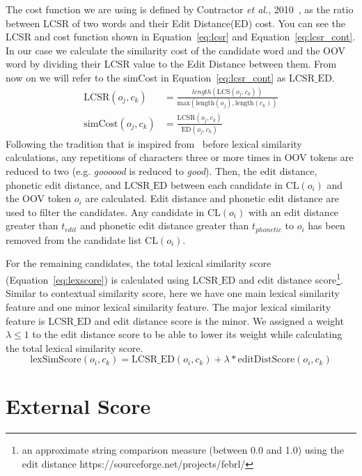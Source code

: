 \documentclass[a4paper,onesided,12pt]{report}
\begin{document}
The cost function we are using is defined by Contractor \textit{et al.}, 2010~\cite{Contractor:2010:UCN:1944566.1944588}, as the ratio between LCSR of two words and their Edit Distance(ED) cost. You can see the LCSR and cost function shown in Equation~\ref{eq:lcsr} and Equation~\ref{eq:lcsr_cont}. In our case we calculate the similarity cost of the candidate word and the OOV word by dividing their LCSR value to the Edit Distance between them. From now on we will refer to the simCost in Equation~\ref{eq:lcsr_cont} as $\text{LCSR\_ED}$.
\begin{align}
\text{LCSR}(o_j,c_k) &= \frac{length(\text{LCS}(o_j,c_k))}{\text{max}(\text{length}(o_j),\text{length}(c_k))} \label{eq:lcsr}      \\
\text{simCost} (o_j,c_k) &= \frac{\text{LCSR}(o_j,c_k)}{\text{ED}(o_j,c_k)} \label{eq:lcsr_cont}
\end{align}
Following the tradition that is inspired from~\cite{Kaufmann2010} before lexical similarity calculations, any repetitions of characters three or more times in OOV tokens are reduced to two (e.g. \emph{goooood} is reduced to \emph{good}). Then, the edit distance, phonetic edit distance, and $\text{LCSR\_ED}$ between each candidate in $\text{CL}(o_{i})$ and the OOV token $o_i$ are calculated. Edit distance and phonetic edit distance are used to filter the candidates. Any candidate in $\text{CL}(o_{i})$ with an edit distance greater than $t_{edit}$ and phonetic edit distance greater than $t_{phonetic}$ to $o_i$ has been removed from the candidate list $\text{CL}(o_{i})$.

For the remaining candidates, the total lexical similarity score (Equation~\ref{eq:lexscore}) is calculated using $\text{LCSR\_ED}$ and edit distance score\footnote{an approximate string comparison measure (between 0.0 and 1.0) using the edit distance https://sourceforge.net/projects/febrl/}. Similar to contextual similarity score, here we have one main lexical similarity feature and one minor lexical similarity feature. The major lexical similarity feature is $\text{LCSR\_ED}$ and edit distance score is the minor. We assigned a weight $\lambda \leq 1$ to the edit distance score to be able to lower its weight while calculating the total lexical similarity score.
\begin{equation}
\text{lexSimScore}(o_i,c_k) = \text{LCSR\_ED}(o_i,c_k) + \lambda * \text{editDistScore}(o_i,c_k)
\label{eq:lexscore}
\end{equation}

\section{External Score}
\end{document}
